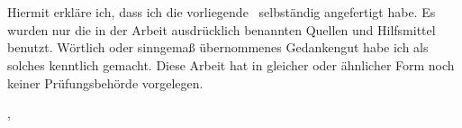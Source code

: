 \chapter*{\DICTDeclarationOnHonour}
\markboth{\MakeUppercase{\DICTDeclarationOnHonour}}{\MakeUppercase{\DICTDeclarationOnHonour}}

Hiermit erkläre ich, dass ich die vorliegende \DICTDocType~selbständig angefertigt habe. Es wurden nur die in der Arbeit ausdrücklich benannten Quellen und Hilfsmittel benutzt. Wörtlich oder sinngemaß übernommenes Gedankengut habe ich als solches kenntlich gemacht. Diese Arbeit hat in gleicher oder ähnlicher Form noch keiner Prüfungsbehörde vorgelegen.
\vspace{20mm}

\DICTDocPlace, \DICTDocDueDate
\vspace{10mm}

\underline{\hspace{8cm}}\\\DICTDocAuthor